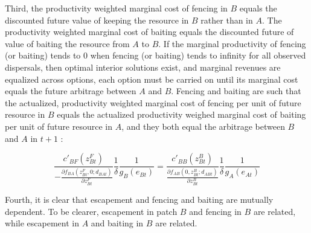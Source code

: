 \documentclass{article}
\begin{document}
Third, the productivity weighted marginal cost of fencing in $B$ equals the discounted future value of keeping the resource in $B$ rather than in $A$. The productivity weighted marginal cost of baiting equals the discounted future of value of baiting the resource from $A$ to $B$. If the marginal productivity of fencing (or baiting) tends to 0 when fencing (or baiting) tends to infinity for all observed dispersals, then optimal interior solutions exist, and marginal revenues are equalized across options, each option must be carried on until its marginal cost equals the future arbitrage between $A$ and $B$.  Fencing and baiting are such that the actualized, productivity weighted marginal cost of fencing per unit of future resource in $B$ equals the actualized productivity weighed marginal cost of baiting per unit of future resource in $A$, and they both equal the arbitrage between $B$ and $A$ in $t+1$ : 

$$
\frac{c'_{BF}(z_{Bt}^F)}{-\frac{\partial f_{BA}(z_{Bt}^F, 0; d_{BAt})}{\partial z_{Bt}^F}} \frac{1}{\delta} \frac{1}{g_B(e_{Bt})} = \frac{c'_{BB}(z_{Bt}^B)}{\frac{\partial f_{AB}(0, z_{Bt}^B; d_{ABt})}{\partial z_{Bt}^B}} \frac{1}{\delta} \frac{1}{g_A(e_{At})}
$$

Fourth, it is clear that escapement and fencing and baiting are mutually dependent. To be clearer, escapement in patch $B$ and fencing in $B$ are related, while escapement in $A$ and baiting in $B$ are related. 
\end{document}
